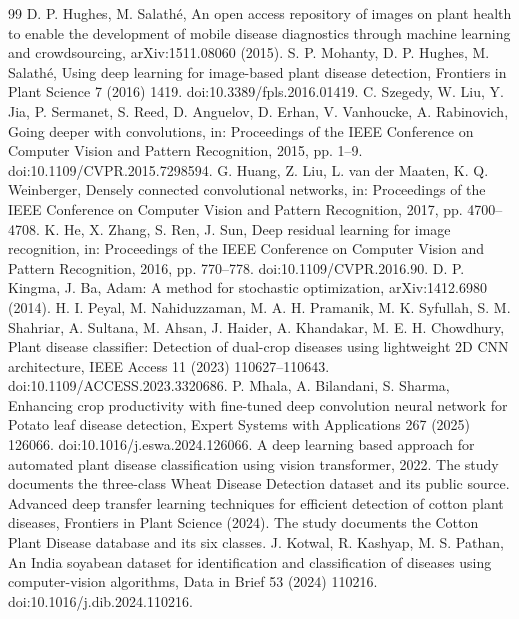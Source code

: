 \documentclass[a4paper,fleqn]{cas-dc}
\begin{document}
\begin{thebibliography}{99}
 D. P. Hughes, M. Salathé, An open access repository of images on plant health to enable the development of mobile disease diagnostics through machine learning and crowdsourcing, arXiv:1511.08060 (2015).
 S. P. Mohanty, D. P. Hughes, M. Salathé, Using deep learning for image-based plant disease detection, Frontiers in Plant Science 7 (2016) 1419. doi:10.3389/fpls.2016.01419.
 C. Szegedy, W. Liu, Y. Jia, P. Sermanet, S. Reed, D. Anguelov, D. Erhan, V. Vanhoucke, A. Rabinovich, Going deeper with convolutions, in: Proceedings of the IEEE Conference on Computer Vision and Pattern Recognition, 2015, pp. 1--9. doi:10.1109/CVPR.2015.7298594.
 G. Huang, Z. Liu, L. van der Maaten, K. Q. Weinberger, Densely connected convolutional networks, in: Proceedings of the IEEE Conference on Computer Vision and Pattern Recognition, 2017, pp. 4700--4708.
 K. He, X. Zhang, S. Ren, J. Sun, Deep residual learning for image recognition, in: Proceedings of the IEEE Conference on Computer Vision and Pattern Recognition, 2016, pp. 770--778. doi:10.1109/CVPR.2016.90.
 D. P. Kingma, J. Ba, Adam: A method for stochastic optimization, arXiv:1412.6980 (2014).
 H. I. Peyal, M. Nahiduzzaman, M. A. H. Pramanik, M. K. Syfullah, S. M. Shahriar, A. Sultana, M. Ahsan, J. Haider, A. Khandakar, M. E. H. Chowdhury, Plant disease classifier: Detection of dual-crop diseases using lightweight 2D CNN architecture, IEEE Access 11 (2023) 110627--110643. doi:10.1109/ACCESS.2023.3320686.
 P. Mhala, A. Bilandani, S. Sharma, Enhancing crop productivity with fine-tuned deep convolution neural network for Potato leaf disease detection, Expert Systems with Applications 267 (2025) 126066. doi:10.1016/j.eswa.2024.126066.
 A deep learning based approach for automated plant disease classification using vision transformer, 2022. The study documents the three-class Wheat Disease Detection dataset and its public source.
 Advanced deep transfer learning techniques for efficient detection of cotton plant diseases, Frontiers in Plant Science (2024). The study documents the Cotton Plant Disease database and its six classes.
 J. Kotwal, R. Kashyap, M. S. Pathan, An India soyabean dataset for identification and classification of diseases using computer-vision algorithms, Data in Brief 53 (2024) 110216. doi:10.1016/j.dib.2024.110216.
\end{thebibliography}
\end{document}
